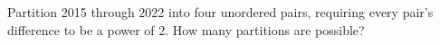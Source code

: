 Partition 2015 through 2022 into four unordered pairs, requiring every pair's difference to be a power of 2. How many partitions are possible?
